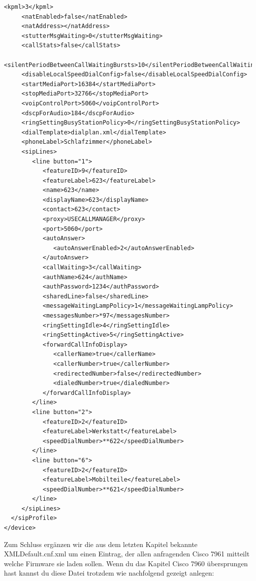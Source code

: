 \documentclass[a4paper,12pt]{scrbook}
\begin{document}
\begin{lstlisting}[caption={SEP\textbf{0012345678DE}.cnf.xml}, label=lst:cisco7961sep0012345678decnfxml]
     <kpml>3</kpml>
     <natEnabled>false</natEnabled>
     <natAddress></natAddress>
     <stutterMsgWaiting>0</stutterMsgWaiting>
     <callStats>false</callStats>
     <silentPeriodBetweenCallWaitingBursts>10</silentPeriodBetweenCallWaitingBursts>
     <disableLocalSpeedDialConfig>false</disableLocalSpeedDialConfig>
     <startMediaPort>16384</startMediaPort>
     <stopMediaPort>32766</stopMediaPort>
     <voipControlPort>5060</voipControlPort>
     <dscpForAudio>184</dscpForAudio>
     <ringSettingBusyStationPolicy>0</ringSettingBusyStationPolicy>
     <dialTemplate>dialplan.xml</dialTemplate>
     <phoneLabel>Schlafzimmer</phoneLabel>
     <sipLines>
        <line button="1">
           <featureID>9</featureID>
           <featureLabel>623</featureLabel>
           <name>623</name>
           <displayName>623</displayName>
           <contact>623</contact>
           <proxy>USECALLMANAGER</proxy>
           <port>5060</port>
           <autoAnswer>
              <autoAnswerEnabled>2</autoAnswerEnabled>
           </autoAnswer>
           <callWaiting>3</callWaiting>
           <authName>624</authName>
           <authPassword>1234</authPassword>
           <sharedLine>false</sharedLine>
           <messageWaitingLampPolicy>1</messageWaitingLampPolicy>
           <messagesNumber>*97</messagesNumber>
           <ringSettingIdle>4</ringSettingIdle>
           <ringSettingActive>5</ringSettingActive>
           <forwardCallInfoDisplay>
              <callerName>true</callerName>
              <callerNumber>true</callerNumber>
              <redirectedNumber>false</redirectedNumber>
              <dialedNumber>true</dialedNumber>
           </forwardCallInfoDisplay>
        </line>
        <line button="2">
           <featureID>2</featureID>
           <featureLabel>Werkstatt</featureLabel>
           <speedDialNumber>**622</speedDialNumber>
        </line>
        <line button="6">
           <featureID>2</featureID>
           <featureLabel>Mobilteile</featureLabel>
           <speedDialNumber>**621</speedDialNumber>
        </line>
     </sipLines>
  </sipProfile>
</device>
\end{lstlisting}

Zum Schluss ergänzen wir die aus dem letzten Kapitel bekannte XMLDefault.cnf.xml um einen Eintrag, der allen anfragenden Cisco 7961 mitteilt welche Firmware sie laden sollen.
Wenn du das Kapitel Cisco 7960 übersprungen hast kannst du diese Datei trotzdem wie nachfolgend gezeigt anlegen:
\end{document}
